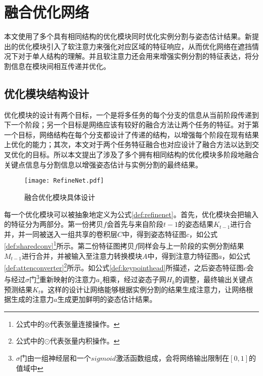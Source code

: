 \section{融合优化网络}
\label{sec:refine}
本文使用了多个具有相同结构的优化模块同时优化实例分割与姿态估计结果。新提出的优化模块引入了软注意力来强化对应区域的特征响应，从而优化网络在遮挡情况下对于单人结构的理解。并且软注意力还会用来增强实例分割的特征表达，将分割信息在模块间相互传递并优化。

\subsection{优化模块结构设计}
\label{subsec:architecture}
优化模块的设计有两个目标，一个是将多任务的每个分支的信息从当前阶段传递到下一个阶段；另一个目标是网络应该有较好的融合方法让两个任务的特征。对于第一个目标，网络结构在每个分支都设计了传递的结构，以增强每个阶段在现有结果上优化的能力；其次，本文对于两个任务特征融合也对应设计了融合方法以达到交叉优化的目标。所以本文提出了涉及了多个拥有相同结构的优化模块多阶段地融合关键点信息与分割信息以增强姿态估计与实例分割的最终结果。

\begin{figure*}[htbp]	
	\centering
	\texttt{[image: RefineNet.pdf]}
	\caption{融合优化模块具体设计}
	\label{fig:RefineNet}
\end{figure*}



每一个优化模块可以被抽象地定义为公式\eqref{def:refinenet}。首先，优化模块会把输入的特征分为两部分。第一份拷贝$f$会首先与来自阶段$t-1$的姿态结果$K_{t-1}$进行合并，并一同被送入一组共享的卷积层$C$中，得到姿态特征图$c$，如公式\eqref{def:sharedconv}\footnote{公式中的$\otimes$代表张量连接操作。}所示。第二份特征图拷贝$f$同样会与上一阶段的实例分割结果$M_{t-1}$进行合并，并被输入至注意力转换模块$A$中，得到注意力特征图$a$，如公式\eqref{def:attenconverter}\footnote{公式中的$\odot$代表张量内积操作。}所示。如公式\eqref{def:keypointhead}所描述，之后姿态特征图$c$会与经过$\sigma$门\footnote{$\sigma$门由一组神经层和一个$sigmoid$激活函数组成，会将网络输出限制在$[0,1]$的值域中}重新映射的注意力$a_s$相乘，经过姿态子网$H_k$的调整，最终输出关键点预测结果$K_t$。这样的设计让网络能够根据实例分割的结果生成注意力，让网络根据生成的注意力$a$生成更加鲜明的姿态估计结果。

